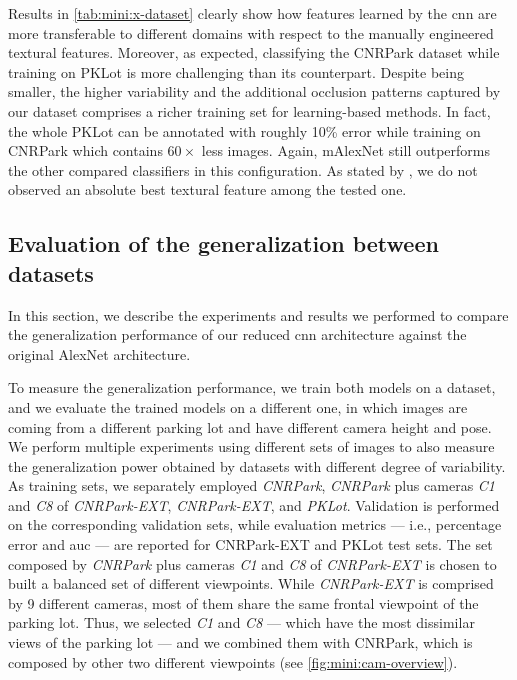 Results in \ref{tab:mini:x-dataset} clearly show how features learned by the \gls{cnn} are more transferable to different domains with respect to the manually engineered textural features.
Moreover, as expected, classifying the CNRPark dataset while training on PKLot is more challenging than its counterpart.
Despite being smaller, the higher variability and the additional occlusion patterns captured by our dataset comprises a richer training set for learning-based methods.
In fact, the whole PKLot can be annotated with roughly 10\% error while training on CNRPark which contains $60\times$ less images.
Again, mAlexNet still outperforms the other compared classifiers in this configuration.
As stated by \citet{de2015pklot}, we do not observed an absolute best textural feature among the tested one.


\subsection{Evaluation of the generalization between datasets}
\label{subsec:mini:generalization}

In this section, we describe the experiments and results we performed to compare the generalization performance of our reduced \gls{cnn} architecture against the original AlexNet architecture.

To measure the generalization performance, we train both models on a dataset, and we evaluate the trained models on a different one, in which images are coming from a different parking lot and have different camera height and pose.
We perform multiple experiments using different sets of images to also measure the generalization power obtained by datasets with different degree of variability.
As training sets, we separately employed \emph{CNRPark}, \emph{CNRPark} plus cameras \emph{C1} and \emph{C8} of \emph{CNRPark-EXT}, \emph{CNRPark-EXT}, and \emph{PKLot}.
Validation is performed on the corresponding validation sets, while evaluation metrics --- i.e., percentage error and \gls{auc} --- are reported for CNRPark-EXT and PKLot test sets.
The set composed by \emph{CNRPark} plus cameras \emph{C1} and \emph{C8} of \emph{CNRPark-EXT} is chosen to built a balanced set of different viewpoints.
While \emph{CNRPark-EXT} is comprised by 9 different cameras, most of them share the same frontal viewpoint of the parking lot.
Thus, we selected \emph{C1} and \emph{C8} --- which have the most dissimilar views of the parking lot --- and we combined them with CNRPark, which is composed by other two different viewpoints (see \ref{fig:mini:cam-overview}).


